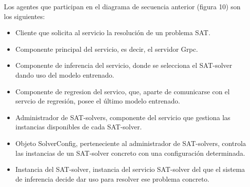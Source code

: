 \documentclass[11pt]{article}
\begin{document}
					Los agentes que participan en el diagrama de secuencia anterior (figura 10) son los siguientes:
					\begin{itemize}
						\item Cliente que solicita al servicio la resolución de un problema SAT.
						\item Componente principal del servicio, es decir, el servidor Grpc.
						\item Componente de inferencia del servicio, donde se selecciona el SAT-solver dando uso del modelo entrenado.
						\item Componente de regresion del servico, que, aparte de comunicarse con el servcio de regresión, posee el último modelo entrenado.
						\item Administrador de SAT-solvers, componente del servicio que gestiona las instancias disponibles de cada SAT-solver.
						\item Objeto SolverConfig, perteneciente al administrador de SAT-solvers, controla las instancias de un SAT-solver concreto con una configuración determinada.
						\item Instancia del SAT-solver, instancia del servicio SAT-solver del que el sistema de inferencia decide dar uso para resolver ese problema concreto.
					\end{itemize}
\end{document}
